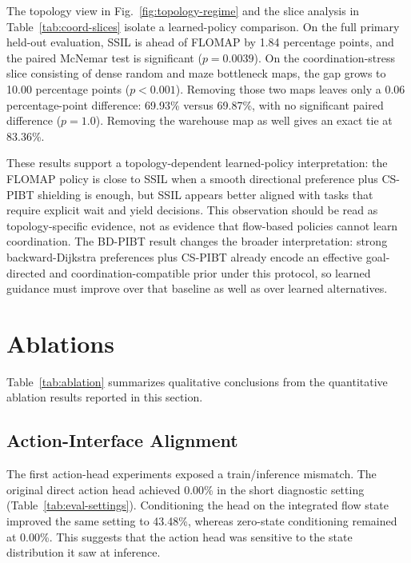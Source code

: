 \documentclass[conference]{IEEEtran}
\begin{document}
The topology view in Fig.~\ref{fig:topology-regime} and the slice analysis in
Table~\ref{tab:coord-slices} isolate a learned-policy comparison.  On the full
primary held-out evaluation, SSIL is ahead of FLOMAP by 1.84 percentage
points, and the paired McNemar test is significant ($p=0.0039$).  On the
coordination-stress slice consisting of dense random and maze bottleneck maps,
the gap grows to 10.00 percentage points ($p<0.001$).  Removing those two maps
leaves only a 0.06 percentage-point difference: 69.93\% versus 69.87\%, with no
significant paired difference ($p=1.0$).
Removing the warehouse map as well gives an exact tie at 83.36\%.

These results support a topology-dependent learned-policy interpretation: the
FLOMAP policy is close to SSIL when a smooth directional preference plus
CS-PIBT shielding is
enough, but SSIL appears better aligned with tasks that require
explicit wait and yield decisions.  This observation should be read as
topology-specific evidence, not as evidence that flow-based policies cannot
learn coordination.  The BD-PIBT result changes the broader interpretation: strong
backward-Dijkstra preferences plus CS-PIBT already encode an effective
goal-directed and coordination-compatible prior under this protocol, so learned
guidance must improve over that baseline as well as over learned alternatives.

\section{Ablations}

Table~\ref{tab:ablation} summarizes qualitative conclusions from the
quantitative ablation results reported in this section.

\begin{table}[!tbp]
\centering
\caption{Ablation inference matrix.  The table emphasizes what each
intervention supports, rather than ranking variants by a single success number.}
\label{tab:ablation}

\end{table}

\subsection{Action-Interface Alignment}

The first action-head experiments exposed a train/inference mismatch.  The
original direct action head achieved 0.00\% in the short diagnostic setting
(Table~\ref{tab:eval-settings}).  Conditioning the head on the integrated flow
state improved the same setting to 43.48\%, whereas zero-state conditioning
remained at 0.00\%.  This suggests that the action head was sensitive to the
state distribution it saw at inference.
\end{document}
